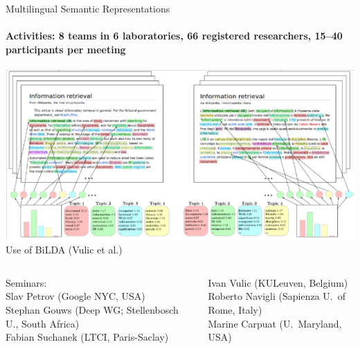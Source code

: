 \begin{frame}{Multilingual Semantic Representations}
  \framesubtitle{Activities: 8 teams in 6 laboratories, 66 registered researchers, 15--40 participants per meeting}

  \begin{center}
    \includegraphics[width=0.65\linewidth]{Images/rsm-multilingual-space-bilda.png}\\
    Use of BiLDA (Vulic et al.)
  \end{center}
  \begin{columns}\small
    \begin{column}{5cm}
      Seminars:\\
      Slav Petrov (Google NYC, USA)\\
      Stephan Gouws (Deep WG; Stellenbosch U., South Africa)\\
      Fabian Suchanek (LTCI, Paris-Saclay)
    \end{column}
    \begin{column}{6cm}
      Ivan Vulic (KULeuven, Belgium)\\
      Roberto Navigli (Sapienza U.\ of Rome, Italy)\\
      Marine Carpuat (U.\ Maryland, USA)
    \end{column}
  \end{columns}

\end{frame}

